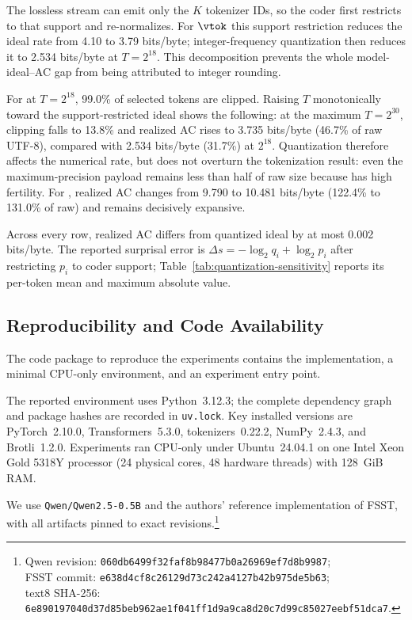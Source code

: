 The lossless stream can emit only the $K$ tokenizer IDs, so the coder first restricts to that support and re-normalizes. For \MinProb{} $\vtok$ this support restriction reduces the ideal rate from 4.10 to 3.79 bits/byte; integer-frequency
quantization then reduces it to 2.534 bits/byte at $T=2^{18}$. This decomposition
prevents the whole model-ideal--AC gap from being attributed to integer rounding.

For \MinProb{} at $T=2^{18}$, 99.0\% of selected tokens are clipped. Raising $T$ monotonically toward the support-restricted ideal shows the following: at the maximum $T=2^{30}$, clipping falls to 13.8\% and realized AC rises to 3.735 bits/byte (46.7\% of raw UTF-8), compared with 2.534 bits/byte (31.7\%) at
$2^{18}$. Quantization therefore affects the numerical \MinProb{} rate,
but does not overturn the tokenization result: even the maximum-precision
payload remains less than half of raw size because \MinProb{} has high fertility.
For \MaxSurprisal{}, realized AC changes from 9.790 to 10.481 bits/byte
(122.4\% to 131.0\% of raw) and remains decisively expansive.

Across every row, realized AC differs from quantized ideal by at most 0.002 bits/byte. The reported surprisal error is $\Delta s=-\log_2q_i+\log_2p_i$ after
restricting $p_i$ to coder support; Table~\ref{tab:quantization-sensitivity}
reports its per-token mean and maximum absolute value.


\clearpage
\subsection{Reproducibility and Code Availability}
\label{app:reproducibility}
The code package to reproduce the experiments contains the implementation, a minimal CPU-only environment, and an experiment entry point.

 The reported environment uses Python~3.12.3; the complete dependency graph and package hashes are recorded in \texttt{uv.lock}. Key installed versions are PyTorch~2.10.0, Transformers~5.3.0, tokenizers~0.22.2, NumPy~2.4.3, and Brotli~1.2.0. Experiments ran CPU-only under Ubuntu~24.04.1 on one Intel Xeon Gold 5318Y processor (24 physical cores, 48 hardware threads) with 128~GiB RAM.

  We use \texttt{Qwen/Qwen2.5-0.5B} and the authors' reference implementation of FSST, with all artifacts pinned to exact revisions.\footnote{Qwen revision: \texttt{060db6499f32faf8b98477b0a26969ef7d8b9987}; \\ FSST commit: \texttt{e638d4cf8c26129d73c242a4127b42b975de5b63};\\
text8 SHA-256: \texttt{6e890197040d37d85beb962ae1f041ff1d9a9ca8d20c7d99c85027eebf51dca7}.}

